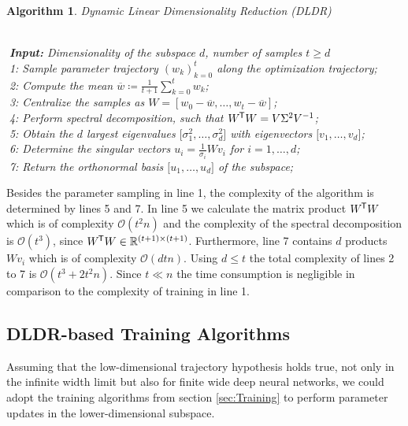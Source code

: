 \documentclass[11pt, a4paper]{article}
\newtheorem{algorithm}[theorem]{Algorithm}
\newcommand{\R}{\mathbb{R}}
\renewcommand{\O}{\mathcal{O}}
\newcommand*{\tr}{^{\mkern-1.5mu\mathsf{T}}}
\begin{document}
\begin{algorithm}
\caption{Dynamic Linear Dimensionality Reduction (DLDR) \textcolor{white}{$\Big |$}} \ \\
\textcolor{white}{$\Big |$}\textbf{Input:} Dimensionality of the subspace $d$, number of samples $t \geq d$ \\
\textcolor{white}{$\Big |$}1: Sample parameter trajectory $(w_k)_{k=0}^{t}$ along the optimization trajectory; \\
\textcolor{white}{$\Big |$}2: Compute the mean $\overline{w} \coloneq \frac{1}{t+1} \sum_{k=0}^{t} w_k$; \\
\textcolor{white}{$\Big |$}3: Centralize the samples as $W = [w_0-\overline{w}, \dots, w_t - \overline{w}]$; \\
\textcolor{white}{$\Big |$}4: Perform spectral decomposition, such that $W\tr W = V \Sigma^2 V^{-1}$;  \\
\textcolor{white}{$\Big |$}5: Obtain the $d$ largest eigenvalues $\big [\sigma_1^2, \dots, \sigma_d^2 \big ]$ with eigenvectors $ \big [v_1, \dots, v_d \big ]$; \\
\textcolor{white}{$\Big |$}6: Determine the singular vectors $u_i = \frac{1}{\sigma_i}Wv_i$ for $i=1, \dots, d$; \\
\textcolor{white}{$\Big |$}7: Return the orthonormal basis $ \big [u_1, \dots, u_d \big ]$ of the subspace;
\end{algorithm}

Besides the parameter sampling in line 1, the complexity of the algorithm is determined by lines 5 and 7. In line 5 we calculate the matrix product $W \tr W$ which is of complexity $\O(t^2n)$ and the complexity of the spectral decomposition is $\O(t^3)$, since $W\tr W \in \R^{(t+1) \times (t+1)}$. Furthermore, line 7 contains $d$ products $Wv_i$ which is of complexity $\O(dtn)$. Using $d\leq t$ the total complexity of lines 2 to 7 is $\O(t^3 + 2t^2n)$. Since $t \ll n$ the time consumption is negligible in comparison to the complexity of training in line 1.

\subsection{DLDR-based Training Algorithms}

Assuming that the low-dimensional trajectory hypothesis holds true, not only in the infinite width limit but also for finite wide deep neural networks, we could adopt the training algorithms from section \ref{sec:Training} to perform parameter updates in the lower-dimensional subspace. \\
\end{document}

